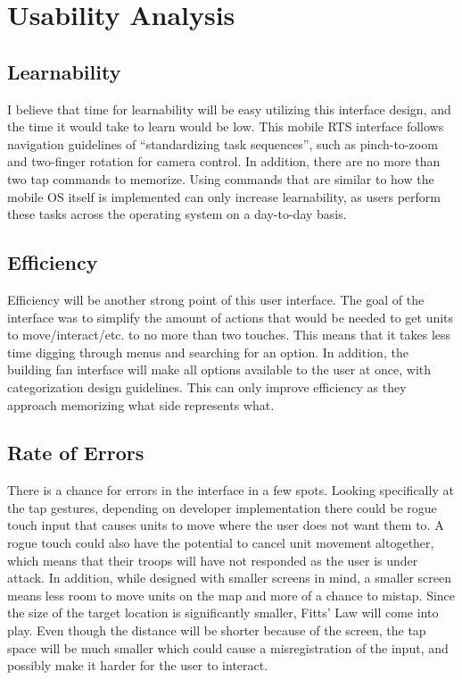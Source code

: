 \documentclass[11pt]{article}
\begin{document}
\section{Usability Analysis}
	\subsection{Learnability}
	I believe that time for learnability will be easy utilizing this interface design, and the time it would take to learn would be low. This mobile RTS interface follows navigation guidelines of ``standardizing task sequences'', such as pinch-to-zoom and two-finger rotation for camera control. In addition, there are no more than two tap commands to memorize. Using commands that are similar to how the mobile OS itself is implemented can only increase learnability, as users perform these tasks across the operating system on a day-to-day basis.
	\subsection{Efficiency}
	Efficiency will be another strong point of this user interface. The goal of the interface was to simplify the amount of actions that would be needed to get units to move/interact/etc. to no more than two touches. This means that it takes less time digging through menus and searching for an option. In addition, the building fan interface will make all options available to the user at once, with categorization design guidelines. This can only improve efficiency as they approach memorizing what side represents what.
	\subsection{Rate of Errors}
	There is a chance for errors in the interface in a few spots. Looking specifically at the tap gestures, depending on developer implementation there could be rogue touch input that causes units to move where the user does not want them to. A rogue touch could also have the potential to cancel unit movement altogether, which means that their troops will have not responded as the user is under attack. In addition, while designed with smaller screens in mind, a smaller screen means less room to move units on the map and more of a chance to mistap. Since the size of the target location is significantly smaller, Fitts' Law will come into play. Even though the distance will be shorter because of the screen, the tap space will be much smaller which could cause a misregistration of the input, and possibly make it harder for the user to interact.
\end{document}
